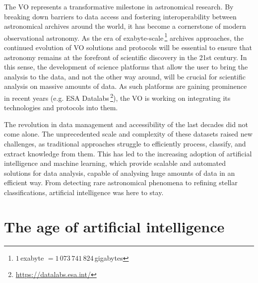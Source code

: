 The VO represents a transformative milestone in astronomical research. By breaking down barriers to data access and fostering interoperability between astronomical archives around the world, it has become a cornerstone of modern observational astronomy. As the era of exabyte-scale\,\footnote{$1$\,exabyte $ = 1\,073\,741\,824$\,gigabytes} archives approaches, the continued evolution of VO solutions and protocols will be essential to ensure that astronomy remains at the forefront of scientific discovery in the 21st century. In this sense, the development of science platforms that allow the user to bring the analysis to the data, and not the other way around, will be crucial for scientific analysis on massive amounts of data.  As such platforms are gaining prominence in recent years (e.g. ESA Datalabs\,\footnote{\url{https://datalabs.esa.int/}}), the VO is working on integrating its technologies and protocols into them.

The revolution in data management and accessibility of the last decades did not come alone. The unprecedented scale and complexity of these datasets raised new challenges, as traditional approaches struggle to efficiently process, classify, and extract knowledge from them. This has led to the increasing adoption of artificial intelligence and machine learning, which provide scalable and automated solutions for data analysis, capable of analysing huge amounts of data in an efficient way. From detecting rare astronomical phenomena to refining stellar classifications, artificial intelligence was here to stay.




\section{The age of artificial intelligence} \label{chp:ml_intro}


